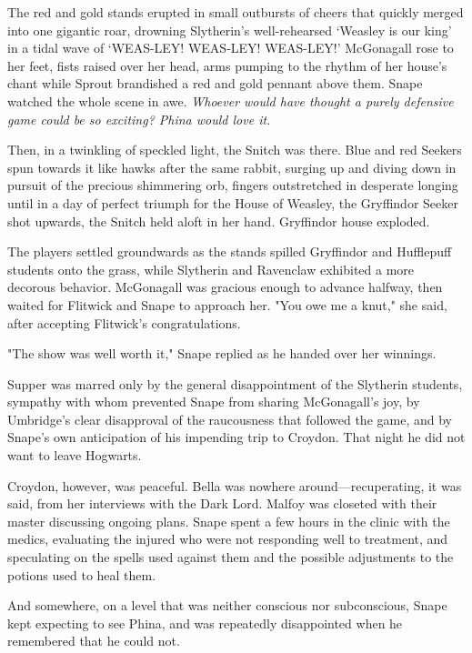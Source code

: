 The red and gold stands erupted in small outbursts of cheers that quickly merged into one gigantic roar, drowning Slytherin's well-rehearsed `Weasley is our king' in a tidal wave of `WEAS-LEY! WEAS-LEY! WEAS-LEY!' McGonagall rose to her feet, fists raised over her head, arms pumping to the rhythm of her house's chant while Sprout brandished a red and gold pennant above them. Snape watched the whole scene in awe. \emph{Whoever would have thought a purely defensive game could be so exciting? Phina would love it.}

Then, in a twinkling of speckled light, the Snitch was there. Blue and red Seekers spun towards it like hawks after the same rabbit, surging up and diving down in pursuit of the precious shimmering orb, fingers outstretched in desperate longing until{\el} in a day of perfect triumph for the House of Weasley, the Gryffindor Seeker shot upwards, the Snitch held aloft in her hand. Gryffindor house exploded.

The players settled groundwards as the stands spilled Gryffindor and Hufflepuff students onto the grass, while Slytherin and Ravenclaw exhibited a more decorous behavior. McGonagall was gracious enough to advance halfway, then waited for Flitwick and Snape to approach her. "You owe me a knut," she said, after accepting Flitwick's congratulations.

"The show was well worth it," Snape replied as he handed over her winnings.

Supper was marred only by the general disappointment of the Slytherin students, sympathy with whom prevented Snape from sharing McGonagall's joy, by Umbridge's clear disapproval of the raucousness that followed the game, and by Snape's own anticipation of his impending trip to Croydon. That night he did not want to leave Hogwarts.

Croydon, however, was peaceful. Bella was nowhere around—recu\-per\-ating, it was said, from her interviews with the Dark Lord. Malfoy was closeted with their master discussing ongoing plans. Snape spent a few hours in the clinic with the medics, evaluating the injured who were not responding well to treatment, and speculating on the spells used against them and the possible adjustments to the potions used to heal them.

And somewhere, on a level that was neither conscious nor subconscious, Snape kept expecting to see Phina, and was repeatedly disappointed when he remembered that he could not.

